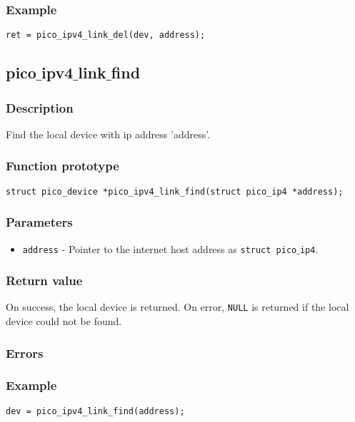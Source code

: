 \subsubsection*{Example}
\begin{verbatim}
ret = pico_ipv4_link_del(dev, address);
\end{verbatim}



\subsection{pico$\_$ipv4$\_$link$\_$find}

\subsubsection*{Description}
Find the local device with ip address 'address'.

\subsubsection*{Function prototype}
\begin{verbatim}
struct pico_device *pico_ipv4_link_find(struct pico_ip4 *address);
\end{verbatim}

\subsubsection*{Parameters}
\begin{itemize}[noitemsep]
\item \texttt{address} - Pointer to the internet host address as \texttt{struct pico$\_$ip4}.
\end{itemize}

\subsubsection*{Return value}
On success, the local device is returned. On error, \texttt{NULL} is returned if the local device could not be found. 

\subsubsection*{Errors}

\subsubsection*{Example}
\begin{verbatim}
dev = pico_ipv4_link_find(address);
\end{verbatim}




